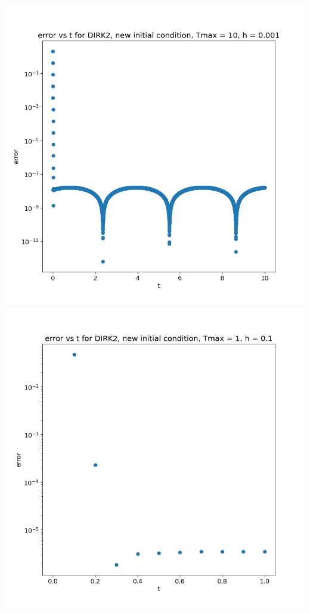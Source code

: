 \documentclass{article}
\begin{document}
\begin{enumerate}[label=(\alph*)]
\begin{center}
	\includegraphics[scale=.3]{hw3 dirk2 err vs t graph 3}
	\includegraphics[scale=.3]{hw3 dirk2 err vs t graph 4}

\end{center}
\end{enumerate}
\end{document}
